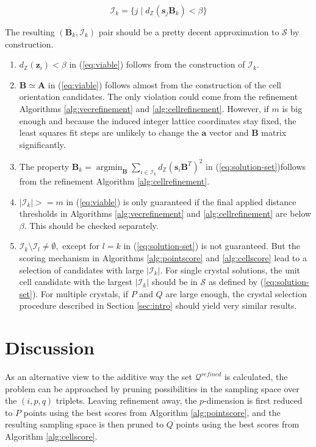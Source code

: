\documentclass[a4paper,10pt]{article}
\DeclareMathOperator*{\argmin}{argmin}
\newcommand{\vect}[1]{\mathbf{#1}}
\newcommand{\mat}[1]{\mathbf{#1}}
\newcommand{\distZ}[1]{d_\mathbb{Z}(#1)}
\begin{document}
\[
 \mathcal{I}_k = \{ j \mid \distZ{\vect{s}_j\mat{B}_k} < \beta \}
\]

The resulting $(\mat{B}_k, \mathcal{I}_k)$ pair should be a pretty decent approximation to $\mathcal{S}$ by construction.

\begin{enumerate}
 \item $\distZ{\vect{z}_i} < \beta$ in (\ref{eq:viable}) follows from the construction of $\mathcal{I}_k$.
 \item $\mat{B} \simeq \mat{A}$ in (\ref{eq:viable}) follows almost from the construction of the cell orientation candidates. The only violation could come from the refinement Algorithms \ref{alg:vecrefinement} and \ref{alg:cellrefinement}. However, if $m$ is big enough and because the induced integer lattice coordinates stay fixed, the least squares fit steps are unlikely to change the $\vect{a}$ vector and $\mat{B}$ matrix significantly.
 \item The property $\mat{B}_k = \argmin_{\mat{B}} \sum_{i\in \mathcal{I}_k} \distZ{\vect{s}_i\mat{B}^T}^2$ in (\ref{eq:solution-set})follows from the refinement Algorithm \ref{alg:cellrefinement}.
 \item $|\mathcal{I}_k| >= m$ in (\ref{eq:viable}) is only guaranteed if the final applied distance thresholds in Algorithms \ref{alg:vecrefinement} and \ref{alg:cellrefinement} are below $\beta$. This should be checked separately.
 \item $\mathcal{I}_k \setminus \mathcal{I}_l \neq \emptyset,\text{ except for }l=k$ in (\ref{eq:solution-set}) is not guaranteed. But the scoring mechanism in Algorithms \ref{alg:pointscore} and \ref{alg:cellscore} lead to a selection of candidates with large $|\mathcal{I}_k|$. For single crystal solutions, the unit cell candidate with the largest $|\mathcal{I}_k|$ should be in $\mathcal{S}$ as defined by (\ref{eq:solution-set}). For multiple crystals, if $P$ and $Q$ are large enough, the crystal selection procedure described in Section \ref{sec:intro} should yield very similar results.
\end{enumerate}


\section{Discussion}

As an alternative view to the additive way the set $\mathcal{Q}^{refined}$ is calculated, the problem can be approached by pruning possibilities in the sampling space over the $(i,p,q)$ triplets. Leaving refinement away, the $p$-dimension is first reduced to $P$ points using the best scores from Algorithm \ref{alg:pointscore}, and the resulting sampling space is then pruned to $Q$ points using the best scores from Algorithm \ref{alg:cellscore}.

\printbibliography
\end{document}
